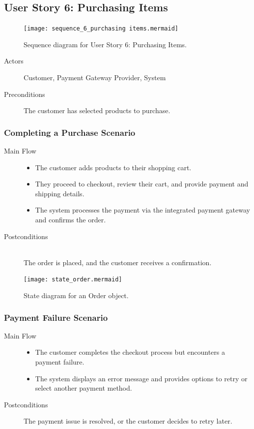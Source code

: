 \documentclass[twoside,a4paper,journal]{IEEEtran}
\begin{document}
\subsection{User Story 6: Purchasing Items}
\begin{figure}[!t]
\centering
\texttt{[image: sequence\_6\_purchasing items.mermaid]}
\caption{Sequence diagram for User Story 6: Purchasing Items.}
\label{fig:sequence_6}
\end{figure}
\begin{description}
  \item[Actors] Customer, Payment Gateway Provider, System
  \item[Preconditions] \hfill
    The customer has selected products to purchase.
\end{description}
\subsubsection{Completing a Purchase Scenario}
\begin{description}
  \item[Main Flow] \hfill
    \begin{itemize}
      \item The customer adds products to their shopping cart.
      \item They proceed to checkout, review their cart, and provide payment and
        shipping details.
      \item The system processes the payment via the integrated payment gateway
        and confirms the order.
    \end{itemize}
  \item[Postconditions] \hfill \\
    The order is placed, and the customer receives a confirmation.
\end{description}
\begin{figure}[!t]
\centering
\texttt{[image: state\_order.mermaid]}
\caption{State diagram for an Order object.}
\label{fig:state_order}
\end{figure}
\subsubsection{Payment Failure Scenario}
\begin{description}
  \item[Main Flow] \hfill
    \begin{itemize}
      \item The customer completes the checkout process but encounters a payment
        failure.
      \item The system displays an error message and provides options to retry
        or select another payment method.
    \end{itemize}
  \item[Postconditions]
    The payment issue is resolved, or the customer decides to retry later.
\end{description}
\end{document}
